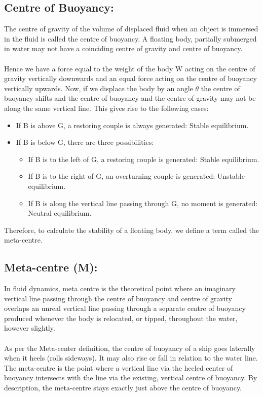 \documentclass[12pt,a4paper]{article}
\begin{document}
\subsection{Centre of Buoyancy:}
The centre of gravity of the volume of displaced fluid when an object is immersed in the fluid is called the centre of buoyancy. A floating body, partially submerged in water may not have a coinciding centre of gravity and centre of buoyancy.\\
\\Hence we have a force equal to the weight of the body W acting on the centre of gravity vertically downwards and an equal force acting on the centre of buoyancy vertically upwards. Now, if we displace the body by an angle $\theta$ the centre of buoyancy shifts and the centre of buoyancy and the centre of gravity may not be along the same vertical line. This gives rise to the following cases:
\begin{itemize}
\item If B is above G, a restoring couple is always generated: Stable equilibrium.
\item If B is below G, there are three possibilities:
\begin{itemize}
\item If B is to the left of G, a restoring couple is generated: Stable equilibrium.
\item If B is to the right of G, an overturning couple is generated: Unstable equilibrium.
\item If B is along the vertical line passing through G, no moment is generated: Neutral equilibrium.
\end{itemize}
\end{itemize}
Therefore, to calculate the stability of a floating body, we define a term called the meta-centre.
\subsection{Meta-centre (M):}
In fluid dynamics, meta centre is the theoretical point where an imaginary vertical line passing through the centre of buoyancy and centre of gravity overlaps an unreal vertical line passing through a separate centre of buoyancy produced whenever the body is relocated, or tipped, throughout the water, however slightly.\\
\\As per the Meta-center definition, the centre of buoyancy of a ship goes laterally when it heels (rolls sideways). It may also rise or fall in relation to the water line. The meta-centre is the point where a vertical line via the heeled center of buoyancy intersects with the line via the existing, vertical centre of buoyancy. By description, the meta-centre stays exactly just above the centre of buoyancy.
\end{document}
